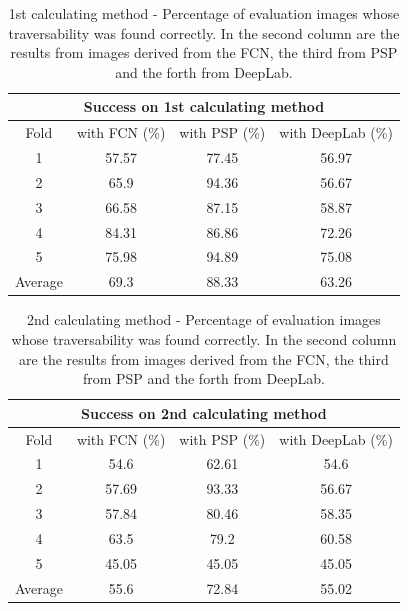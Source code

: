 \documentclass[12pt,a4paper,table,dvipsnames,tikz]{report}
\newcommand{\acronym}{\MakeUppercase}
\begin{document}
	\begin{table}[h!]
		\caption{1st calculating method - Percentage of evaluation images whose 
			traversability was found correctly. In the second column are the results from 
			images derived from the \acronym{fcn}, the third from \acronym{psp} and the 
			forth from DeepLab.}
		\centering
		\begin{tabular}{|c|c|c|c|}
			\hline
			\multicolumn{4}{|c|}{Success on 1st calculating method}\\
			\hline
			Fold & with \acronym{fcn} (\%) & with \acronym{psp} (\%) & with DeepLab (\%)\\ 
			\hline\hline
			1 & 57.57 & 77.45 & 56.97\\
			\hline
			2 & 65.9 & 94.36 & 56.67\\
			\hline
			3 & 66.58 & 87.15 & 58.87\\
			\hline
			4 & 84.31 & 86.86 & 72.26\\
			\hline
			5 & 75.98 & 94.89 & 75.08\\
			\hline\hline
			Average & 69.3 & 88.33 & 63.26\\
			\hline
		\end{tabular}
		\label{table:1st}
	\end{table}
	
	\begin{table}[h!]
		\caption{2nd calculating method - Percentage of evaluation images whose 
			traversability was found correctly. In the second column are the results from 
			images derived from the \acronym{fcn}, the third from \acronym{psp} and the 
			forth from DeepLab.}
		\centering
		\begin{tabular}{|c|c|c|c|}
			\hline
			\multicolumn{4}{|c|}{Success on 2nd calculating method}\\
			\hline
			Fold & with \acronym{fcn} (\%) & with \acronym{psp} (\%) & with DeepLab (\%)\\ 
			\hline\hline
			1 & 54.6 & 62.61 & 54.6\\
			\hline
			2 & 57.69 & 93.33 & 56.67\\
			\hline
			3 & 57.84 & 80.46 & 58.35\\
			\hline
			4 & 63.5 & 79.2 & 60.58\\
			\hline
			5 & 45.05 & 45.05 & 45.05\\
			\hline\hline
			Average & 55.6 & 72.84 & 55.02\\
			\hline
		\end{tabular}
		\label{table:2nd}
	\end{table}
	
\end{document}
